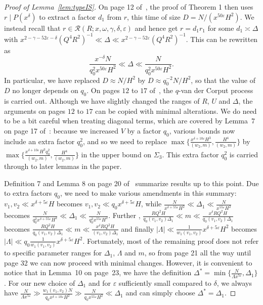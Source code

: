 \documentclass{amsart}
\numberwithin{equation}{section}
\begin{document}
\begin{proof}[Proof of Lemma~\ref{lem:typeIS}]
\medskip On page 12 of~\cite{Stadlmann:2023:PAP}, the   proof  of Theorem 1 then uses $r \mid P(x^\delta)$ to extract a factor $d_1$ from $r$, this time of size $D = N/(x^{50\varepsilon} H^2)$. We instead recall that $r \in \mathcal{R}(R;x,\omega,\gamma,\delta,\varepsilon)$ and hence  get $r=d_1 r_1 $ for some $d_1 \asymp \Delta$ with  $x^{2-\gamma-52\varepsilon -\delta}  (Q^4R^2)^{-1} \ll \Delta \ll    x^{2-\gamma-52\varepsilon}  (Q^4R^2)^{-1}$. This can be rewritten as
$$ 
\frac{ x^{-\delta} N}{q_0^2 x^{ 50\varepsilon  } H^2}   \ll \Delta \ll   \frac{   N}{q_0^2 x^{ 50\varepsilon  } H^2}.  
$$
In particular, we have   replaced $D\approx N/H^2$ by $D \approx q_0^{-2} N/H^2$, so that  the value of $D$ no longer depends on $q_0$. 
On pages $12$ to $17$ of~\cite{Stadlmann:2023:PAP}, the $q$-van der Corput process is carried out. Although we have slightly changed the ranges of  $R$, $U$ and $\Delta$, the arguments on   pages $12$ to $17$ can be copied with minimal alterations. We do need to be a bit careful when treating   diagonal terms, which are covered by Lemma~7  on page 17 of~\cite{Stadlmann:2023:PAP}: because we increased $V$ by a factor $q_0$, various bounds now include an extra factor $q_0^2$, and so we need to replace $\max\{\frac{x^{\delta+10\varepsilon }H^3 }{(w_2,m)}, \frac{H^4}{(w_2,m)}\}$ by $\max\{\frac{x^{\delta+10\varepsilon }H^3 q_0^2}{(w_2,m)}, \frac{H^4}{(w_2,m)}\}$ in the upper bound on $\Sigma_3$. This extra factor $q_0^2$ is carried through to later lemmas in the paper. 

\medskip Definition 7 and Lemma 8 on page 20 of~\cite{Stadlmann:2023:PAP} summarize results up to this point. Due to extra factors $q_0$, we need to make various amendments in this summary: $v_1, v_2 \ll x^{\delta + 5\varepsilon} H$ becomes $v_1, v_2 \ll q_0 x^{\delta + 5\varepsilon} H$, while $\frac{N}{x^{\delta+55\varepsilon} H^2} \ll \Delta_1 \ll \frac{N}{x^{55\varepsilon} H^2}$ becomes 
 $\frac{N}{q_0^2x^{\delta+55\varepsilon} H^2} \ll \Delta_1 \ll \frac{N}{q_0^2x^{55\varepsilon} H^2}$. Further , $\frac{RQ^2H}{q_0 (v_1,v_2)\Delta_1} \ll m \ll \frac{x^\delta RQ^2H}{q_0 (v_1,v_2)\Delta_1}$ becomes $\frac{RQ^2H}{q_0 (v_1,v_2)\Delta_1} \ll m \ll \frac{x^\delta RQ^2H}{(v_1,v_2)\Delta_1}$ and finally $|\Lambda| \ll \frac{1}{w_1(v_1,v_2)} x^{\delta+5\varepsilon} H^2$ becomes $|\Lambda| \ll q_0 \frac{1}{w_1(v_1,v_2)} x^{\delta+5\varepsilon} H^2$. Fortunately, most of the remaining proof does not refer to specific parameter ranges for $\Delta_1$, $\Lambda$ and $m$, so from page 21 all the way until page 32 we can now proceed with minimal changes. However, it is convenient to notice that in Lemma~10 on page~23, we have the definition $\Delta^* = \min\{\frac{N}{\Lambda x^{5\varepsilon}}, \Delta_1\}$. For our new choice of $\Delta_1$ and for $\varepsilon$ sufficiently small compared to $\delta$, we always have $\frac{N}{\Lambda x^{5\varepsilon}} \gg \frac{w_1 (v_1,v_2) N}{q_0 x^{\delta +10\varepsilon} H^2  } \gg \frac{ N}{q_0 x^{55\varepsilon} H^2  }  \ll \Delta_1$ and can simply choose $\Delta^* = \Delta_1$. 
 

\end{proof}
\end{document}
